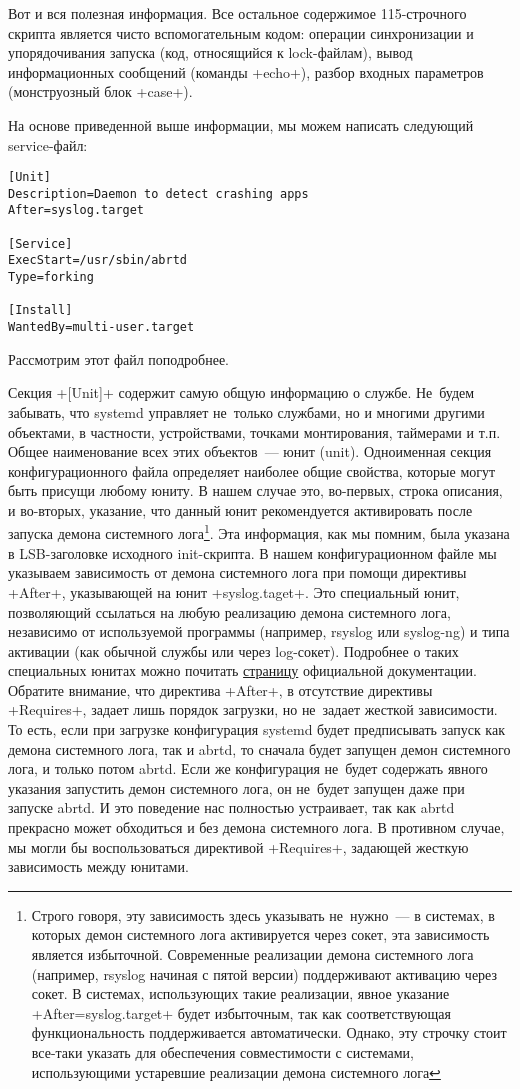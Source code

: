 \documentclass[10pt,oneside,a4paper]{article}
\begin{document}
Вот и вся полезная информация. Все остальное содержимое 115-строчного скрипта
является чисто вспомогательным кодом: операции синхронизации и упорядочивания
запуска (код, относящийся к lock-файлам), вывод информационных сообщений
(команды +echo+), разбор входных параметров (монструозный блок
+case+).

На основе приведенной выше информации, мы можем написать следующий
service-файл: 
\begin{Verbatim}
[Unit]
Description=Daemon to detect crashing apps
After=syslog.target

[Service]
ExecStart=/usr/sbin/abrtd
Type=forking

[Install]
WantedBy=multi-user.target
\end{Verbatim}

Рассмотрим этот файл поподробнее.

Секция +[Unit]+ содержит самую общую информацию о службе. Не~будем
забывать, что systemd управляет не~только службами, но и многими другими
объектами, в частности, устройствами, точками монтирования, таймерами и т.п.
Общее наименование всех этих объектов~--- юнит (unit). Одноименная секция
конфигурационного файла определяет наиболее общие свойства, которые могут
быть присущи любому юниту. В нашем случае это, во-первых, строка описания, и
во-вторых, указание, что данный юнит рекомендуется активировать после запуска
демона системного лога\footnote{Строго говоря, эту зависимость здесь
указывать не~нужно~--- в системах, в которых демон системного лога активируется
через сокет, эта зависимость является избыточной. Современные реализации
демона системного лога (например, rsyslog начиная с пятой версии)
поддерживают активацию через сокет. В системах, использующих такие
реализации, явное указание +After=syslog.target+ будет избыточным, так
как соответствующая функциональность поддерживается автоматически. Однако,
эту строчку стоит все-таки указать для обеспечения совместимости с системами,
использующими устаревшие реализации демона системного лога}. Эта информация,
как мы помним, была указана в LSB-заголовке исходного init-скрипта. В нашем
конфигурационном файле мы указываем зависимость от демона системного лога при
помощи директивы +After+, указывающей на юнит +syslog.taget+. Это
специальный юнит, позволяющий ссылаться на любую реализацию демона системного
лога, независимо от используемой программы (например, rsyslog или syslog-ng)
и типа активации (как обычной службы или через log-сокет). Подробнее о таких
специальных юнитах можно почитать
\href{http://0pointer.de/public/systemd-man/systemd.special.html}{страницу}
официальной документации. Обратите внимание, что директива +After+, в
отсутствие директивы +Requires+, задает лишь порядок загрузки, но
не~задает жесткой зависимости. То есть, если при загрузке конфигурация
systemd будет предписывать запуск как демона системного лога, так и abrtd, то
сначала будет запущен демон системного лога, и только потом abrtd. Если же
конфигурация не~будет содержать явного указания запустить демон системного
лога, он не~будет запущен даже при запуске abrtd. И это поведение нас
полностью устраивает, так как abrtd прекрасно может обходиться и без демона
системного лога. В противном случае, мы могли бы воспользоваться директивой
+Requires+, задающей жесткую зависимость между юнитами.
\end{document}
